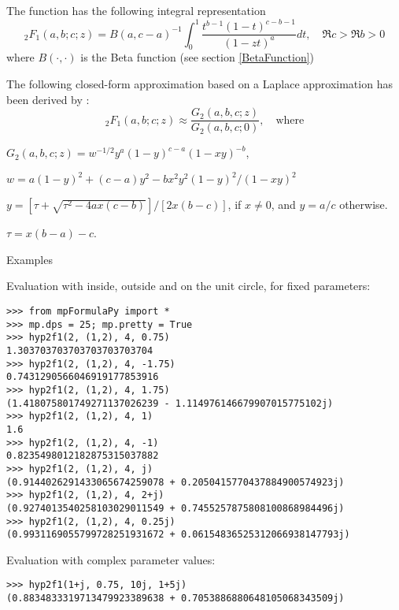 The function has the following integral representation
\begin{equation}
{}_2{F}_1(a,b;c;z)  =  B(a,c-a)^{-1}  \int_0^1{\frac{t^{b-1}(1-t)^{c-b-1}}{(1-zt)^a}}dt, \quad \Re c > \Re b > 0
\end{equation}
where $B(\cdot,\cdot)$ is the Beta function (see section \ref{BetaFunction})

The following closed-form approximation based on a Laplace approximation has been derived by \cite{Butler_Wood_2002}:
\begin{equation}
{}_2{F}_1(a,b;c;z)  \approx  \frac{G_2(a,b,c;z)}{G_2(a,b,c;0)}, \quad \text{where}
\end{equation}
\begin{center}
	$G_2(a,b,c;z) = w^{-1/2} y^a (1-y)^{c-a} (1-xy)^{-b}$,
	
	\vspace{0.3cm}
	$w = a(1-y)^2 + (c-a)y^2 - b x^2 y^2 (1-y)^2 / (1-xy)^2$
	
	\vspace{0.3cm}
	$y = [\tau + \sqrt{\tau^2 - 4ax (c-b)}] / [2x(b-c)]$, if $x \neq 0$, and $y=a/c$ otherwise.
	
	\vspace{0.3cm}
	$\tau = x(b-a)-c$.
\end{center}


\vpara
Examples

Evaluation with inside, outside and on the unit circle, for fixed parameters:

\begin{lstlisting}
>>> from mpFormulaPy import *
>>> mp.dps = 25; mp.pretty = True
>>> hyp2f1(2, (1,2), 4, 0.75)
1.303703703703703703703704
>>> hyp2f1(2, (1,2), 4, -1.75)
0.7431290566046919177853916
>>> hyp2f1(2, (1,2), 4, 1.75)
(1.418075801749271137026239 - 1.114976146679907015775102j)
>>> hyp2f1(2, (1,2), 4, 1)
1.6
>>> hyp2f1(2, (1,2), 4, -1)
0.8235498012182875315037882
>>> hyp2f1(2, (1,2), 4, j)
(0.9144026291433065674259078 + 0.2050415770437884900574923j)
>>> hyp2f1(2, (1,2), 4, 2+j)
(0.9274013540258103029011549 + 0.7455257875808100868984496j)
>>> hyp2f1(2, (1,2), 4, 0.25j)
(0.9931169055799728251931672 + 0.06154836525312066938147793j)
\end{lstlisting}

Evaluation with complex parameter values:

\begin{lstlisting}
>>> hyp2f1(1+j, 0.75, 10j, 1+5j)
(0.8834833319713479923389638 + 0.7053886880648105068343509j)
\end{lstlisting}

